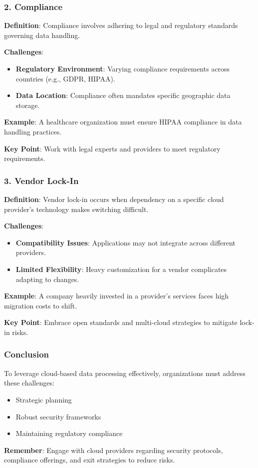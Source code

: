 \documentclass{beamer}
\begin{document}
\begin{frame}[fragile]
    \frametitle{2. Compliance}
    \textbf{Definition}: Compliance involves adhering to legal and regulatory standards governing data handling.

    \textbf{Challenges}:
    \begin{itemize}
        \item \textbf{Regulatory Environment}: Varying compliance requirements across countries (e.g., GDPR, HIPAA).
        \item \textbf{Data Location}: Compliance often mandates specific geographic data storage.
    \end{itemize}

    \textbf{Example}: A healthcare organization must ensure HIPAA compliance in data handling practices.

    \textbf{Key Point}: Work with legal experts and providers to meet regulatory requirements.
\end{frame}

\begin{frame}[fragile]
    \frametitle{3. Vendor Lock-In}
    \textbf{Definition}: Vendor lock-in occurs when dependency on a specific cloud provider's technology makes switching difficult.

    \textbf{Challenges}:
    \begin{itemize}
        \item \textbf{Compatibility Issues}: Applications may not integrate across different providers.
        \item \textbf{Limited Flexibility}: Heavy customization for a vendor complicates adapting to changes.
    \end{itemize}

    \textbf{Example}: A company heavily invested in a provider’s services faces high migration costs to shift.

    \textbf{Key Point}: Embrace open standards and multi-cloud strategies to mitigate lock-in risks.
\end{frame}

\begin{frame}[fragile]
    \frametitle{Conclusion}
    To leverage cloud-based data processing effectively, organizations must address these challenges:
    \begin{itemize}
        \item Strategic planning
        \item Robust security frameworks
        \item Maintaining regulatory compliance
    \end{itemize}

    \textbf{Remember}: Engage with cloud providers regarding security protocols, compliance offerings, and exit strategies to reduce risks.
\end{frame}
\end{document}
